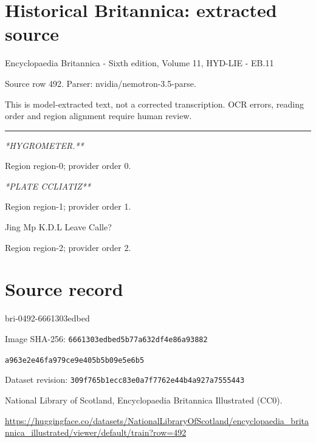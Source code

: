 \documentclass[11pt]{article}
\begin{document}
\section*{Historical Britannica: extracted source}
Encyclopaedia Britannica - Sixth edition, Volume 11, HYD-LIE - EB.11\par
{\small Source row 492. Parser: nvidia/nemotron-3.5-parse.\par}
{\small This is model-extracted text, not a corrected transcription. OCR errors, reading order and region alignment require human review.\par}
\hrule\medskip
{\small\itshape **HYGROMETER.**\par}

{\scriptsize\color{gray} Region region-0; provider order 0.\par}
\medskip

{\small\itshape **PLATE CCLIATIZ**\par}

{\scriptsize\color{gray} Region region-1; provider order 1.\par}
\medskip

Jing Mp K.D.L Leave Calle?
\par

{\scriptsize\color{gray} Region region-2; provider order 2.\par}
\medskip
\newpage\section*{Source record}
bri-0492-6661303edbed\par
Image SHA-256: \texttt{6661303edbed5b77a632df4e86a93882}\par\texttt{a963e2e46fa979ce9e405b5b09e5e6b5}\par
Dataset revision: \texttt{309f765b1ecc83e0a7f7}\texttt{762e44b4a927a7555443}\par
National Library of Scotland, Encyclopaedia Britannica Illustrated (CC0).\par
\url{https://huggingface.co/datasets/NationalLibraryOfScotland/encyclopaedia_britannica_illustrated/viewer/default/train?row=492}
\end{document}
